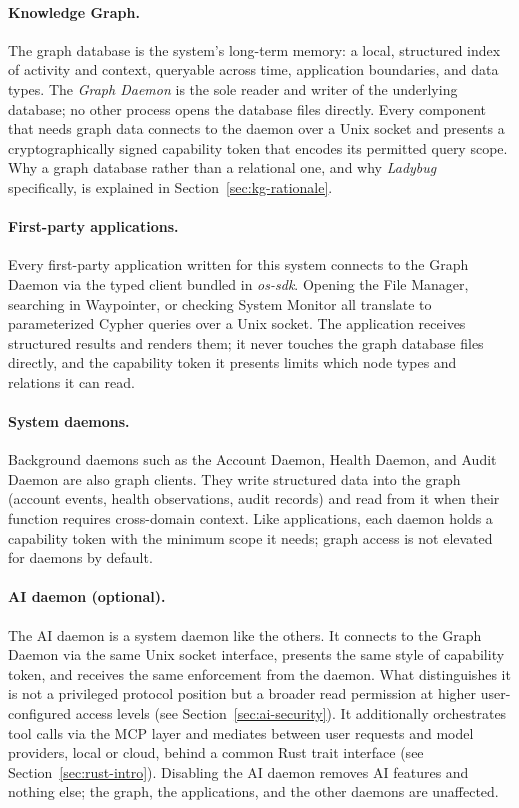 \paragraph{Knowledge Graph.}
The graph database is the system's long-term memory: a local, structured index
of activity and context, queryable across time, application
boundaries, and data types. The \emph{Graph Daemon} is the sole reader and
writer of the underlying database; no other process opens the database files
directly. Every component that needs graph data connects to the daemon over a
Unix socket and presents a cryptographically signed capability token that encodes
its permitted query scope. Why a graph database rather than a relational one,
and why \emph{Ladybug}~\cite{ladybug} specifically, is explained in
Section~\ref{sec:kg-rationale}.

\paragraph{First-party applications.}
Every first-party application written for this system connects to the Graph
Daemon via the typed client bundled in \emph{os-sdk}. Opening the File Manager,
searching in Waypointer, or checking System Monitor all translate to parameterized
Cypher queries over a Unix socket. The application receives structured results
and renders them; it never touches the graph database files directly, and the
capability token it presents limits which node types and relations it can read.

\paragraph{System daemons.}
Background daemons such as the Account Daemon, Health Daemon, and Audit Daemon
are also graph clients. They write structured data into the graph (account
events, health observations, audit records) and read from it when their function
requires cross-domain context. Like applications, each daemon holds a
capability token with the minimum scope it needs; graph access is not elevated
for daemons by default.

\paragraph{AI daemon (optional).}
The AI daemon is a system daemon like the others. It connects to the Graph
Daemon via the same Unix socket interface, presents the same style of capability
token, and receives the same enforcement from the daemon. What distinguishes it
is not a privileged protocol position but a broader read permission at higher
user-configured access levels (see Section~\ref{sec:ai-security}). It
additionally orchestrates tool calls via the MCP layer and mediates between user
requests and model providers, local or cloud, behind a common Rust trait
interface (see Section~\ref{sec:rust-intro}). Disabling the AI daemon removes
AI features and nothing else; the graph, the applications, and the other daemons
are unaffected.

